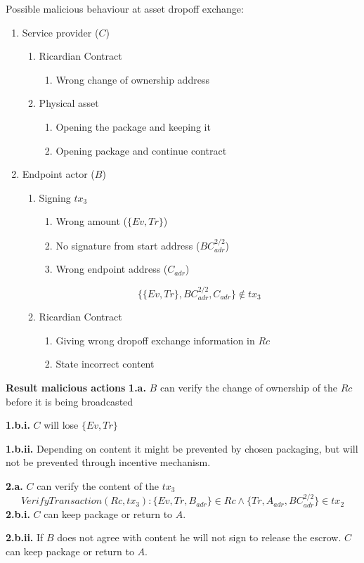 Possible malicious behaviour at asset dropoff exchange:
\begin{enumerate}
  \item Service provider ($C$)
  \begin{enumerate}
    \item Ricardian Contract
    \begin{enumerate}
      \item Wrong change of ownership address
    \end{enumerate}
    \item Physical asset
    \begin{enumerate}
      \item Opening the package and keeping it
      \item Opening package and continue contract
    \end{enumerate}
  \end{enumerate}
  \item Endpoint actor ($B$)
  \begin{enumerate}
    \item Signing $tx_3$
    \begin{enumerate}
      \item Wrong amount ($\{Ev, Tr\}$)
      \item No signature from start address ($BC_{adr}^{2/2}$)
      \item Wrong endpoint address ($C_{adr}$)
    \end{enumerate}
    \[\{\{Ev, Tr\}, BC_{adr}^{2/2}, C_{adr}\}\not\in tx_3\]
    \item Ricardian Contract
    \begin{enumerate}
      \item Giving wrong dropoff exchange information in $Rc$
      \item State incorrect content
    \end{enumerate}
  \end{enumerate}
\end{enumerate}

\bigbreak
\noindent\textbf{Result malicious actions}
\bigbreak
\noindent\textbf{1.a.} $B$ can verify the change of ownership of the $Rc$ before it is being broadcasted \par
\noindent\textbf{1.b.i.} $C$ will lose $\{Ev, Tr\}$ \par
\noindent\textbf{1.b.ii.} Depending on content it might be prevented by chosen packaging, but will not be prevented through incentive mechanism. \par

\noindent\textbf{2.a.} $C$ can verify the content of the $tx_3$
\[VerifyTransaction(Rc, tx_3)\colon\{Ev, Tr, B_{adr}\} \in Rc \land \{Tr, A_{adr}, BC_{adr}^{2/2}\} \in tx_2\]
\noindent\textbf{2.b.i.} $C$ can keep package or return to $A$.\par
\noindent\textbf{2.b.ii.} If $B$ does not agree with content he will not sign to release the escrow. $C$ can keep package or return to $A$.\par

